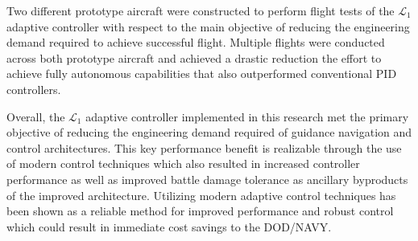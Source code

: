 \documentclass[twoside,thesis,twoadvisorsreader]{npsreport}
\newcommand{\Lone}{$\mathcal{L}_1$ }
\begin{document}
{Two different prototype aircraft were constructed to perform flight tests of the \Lone adaptive controller with respect to the main objective of reducing the engineering demand required to achieve successful flight.  Multiple flights were conducted across both prototype aircraft and achieved a drastic reduction the effort to achieve fully autonomous capabilities that also outperformed conventional PID controllers.  

Overall, the \Lone adaptive controller implemented in this research met the primary objective of reducing the engineering demand required of guidance navigation and control architectures.  This key performance benefit is realizable through the use of modern control techniques which also resulted in increased controller performance as well as improved battle damage tolerance as ancillary byproducts of the improved architecture.  Utilizing modern adaptive control techniques  has been shown as a reliable method for improved performance and robust control which could result in immediate cost savings to the DOD/NAVY.
}


\NPSbody




%
\end{document}
